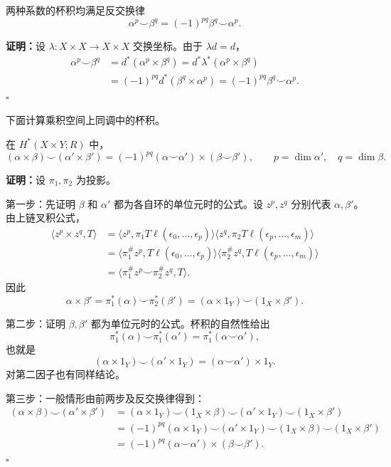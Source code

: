 两种系数的杯积均满足反交换律
\[\alpha^p\smile\beta^q=(-1)^{pq}\beta^q\smile\alpha^p.\]

\textbf{证明：}设 $\lambda:X\times X\to X\times X$ 交换坐标。由于 $\lambda d=d$，
\begin{align*}
\alpha^p\smile\beta^q
&=d^*(\alpha^p\times\beta^q)
=d^*\lambda^*(\alpha^p\times\beta^q)\\
&=(-1)^{pq}d^*(\beta^q\times\alpha^p)
=(-1)^{pq}\beta^q\smile\alpha^p.
\end{align*}
\hfill$\square$

下面计算乘积空间上同调中的杯积。

在 $H^*(X\times Y;R)$ 中，
\[
(\alpha\times\beta)\smile(\alpha'\times\beta')
=(-1)^{pq}(\alpha\smile\alpha')\times(\beta\smile\beta'),
\qquad p=\dim\alpha',\quad q=\dim\beta.
\]

\textbf{证明：}设 $\pi_1,\pi_2$ 为投影。

第一步：先证明 $\beta$ 和 $\alpha'$ 都为各自环的单位元时的公式。设 $z^p,z^q$ 分别代表 $\alpha,\beta'$。由上链叉积公式，
\begin{align*}
\langle z^p\times z^q,T\rangle
&=\langle z^p,\pi_1T\ell(\epsilon_0,\ldots,\epsilon_p)\rangle
\langle z^q,\pi_2T\ell(\epsilon_p,\ldots,\epsilon_m)\rangle\\
&=\langle\pi_1^\#z^p,T\ell(\epsilon_0,\ldots,\epsilon_p)\rangle
\langle\pi_2^\#z^q,T\ell(\epsilon_p,\ldots,\epsilon_m)\rangle\\
&=\langle\pi_1^\#z^p\smile\pi_2^\#z^q,T\rangle.
\end{align*}
因此
\[\alpha\times\beta'=\pi_1^*(\alpha)\smile\pi_2^*(\beta')
=(\alpha\times1_Y)\smile(1_X\times\beta').\]

第二步：证明 $\beta,\beta'$ 都为单位元时的公式。杯积的自然性给出
\[\pi_1^*(\alpha)\smile\pi_1^*(\alpha')=\pi_1^*(\alpha\smile\alpha'),\]
也就是
\[(\alpha\times1_Y)\smile(\alpha'\times1_Y)=(\alpha\smile\alpha')\times1_Y.\]
对第二因子也有同样结论。

第三步：一般情形由前两步及反交换律得到：
\begin{align*}
(\alpha\times\beta)\smile(\alpha'\times\beta')
&=(\alpha\times1_Y)\smile(1_X\times\beta)\smile(\alpha'\times1_Y)\smile(1_X\times\beta')\\
&=(-1)^{pq}(\alpha\times1_Y)\smile(\alpha'\times1_Y)\smile(1_X\times\beta)\smile(1_X\times\beta')\\
&=(-1)^{pq}(\alpha\smile\alpha')\times(\beta\smile\beta').
\end{align*}
\hfill$\square$


